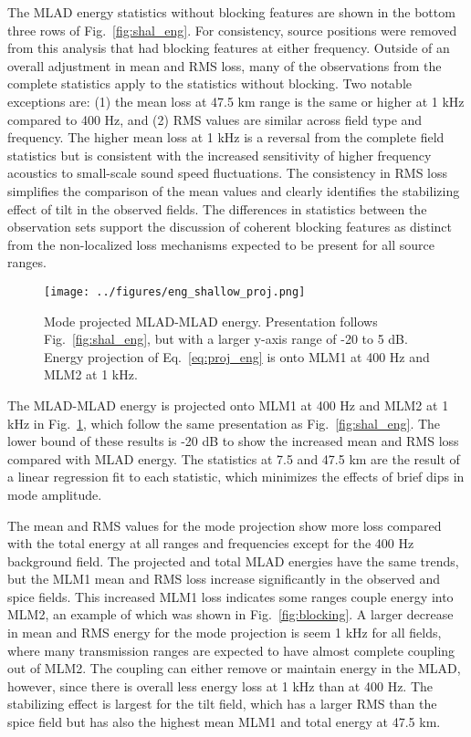 \documentclass[preprint,NumberedRefs]{JASA}
\begin{document}
The MLAD energy statistics without blocking features are shown in the bottom three rows of Fig.~\ref{fig:shal_eng}. For consistency, source positions were removed from this analysis that had blocking features at either frequency. Outside of an overall adjustment in mean and RMS loss, many of the observations from the complete statistics apply to the statistics without blocking. Two notable exceptions are: (1) the mean loss at 47.5 km range is the same or higher at 1 kHz compared to 400 Hz, and (2) RMS values are similar across field type and frequency. The higher mean loss at 1 kHz is a reversal from the complete field statistics but is consistent with the increased sensitivity of higher frequency acoustics to small-scale sound speed fluctuations. The consistency in RMS loss simplifies the comparison of the mean values and clearly identifies the stabilizing effect of tilt in the observed fields. The differences in statistics between the observation sets support the discussion of coherent blocking features as distinct from the non-localized loss mechanisms expected to be present for all source ranges.

\begin{figure}
\texttt{[image: ../figures/eng\_shallow\_proj.png]}
    \caption{Mode projected MLAD-MLAD energy. Presentation follows Fig.~\ref{fig:shal_eng}, but with a larger y-axis range of -20 to 5 dB. Energy projection of Eq.~\eqref{eq:proj_eng} is onto MLM1 at 400 Hz and MLM2 at 1 kHz.}
    \label{fig:shal_proj}
\end{figure}
The MLAD-MLAD energy is projected onto MLM1 at 400 Hz and MLM2 at 1 kHz in Fig.~\ref{fig:shal_proj}, which follow the same presentation as Fig.~\ref{fig:shal_eng}. The lower bound of these results is -20 dB to show the increased mean and RMS loss compared with MLAD energy. The statistics at 7.5 and 47.5 km are the result of a linear regression fit to each statistic, which minimizes the effects of brief dips in mode amplitude.

The mean and RMS values for the mode projection show more loss compared with the total energy at all ranges and frequencies except for the 400 Hz background field. The projected and total MLAD energies have the same trends, but the MLM1 mean and RMS loss increase significantly in the observed and spice fields. This increased MLM1 loss indicates some ranges couple energy into MLM2, an example of which was shown in Fig.~\ref{fig:blocking}. A larger decrease in mean and RMS energy for the mode projection is seem 1 kHz for all fields, where many transmission ranges are expected to have almost complete coupling out of MLM2. The coupling can either remove or maintain energy in the MLAD, however, since there is overall less energy loss at 1 kHz than at 400 Hz. The stabilizing effect is largest for the tilt field, which has a larger RMS than the spice field but has also the highest mean MLM1 and total energy at 47.5 km.
\end{document}
